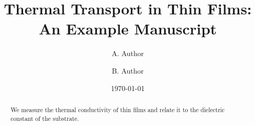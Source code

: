 \documentclass[11pt]{article}
\title{Thermal Transport in Thin Films: An Example Manuscript}
\author{A. Author \and B. Author}
\date{\today}
\begin{document}
\maketitle

\begin{abstract}
We measure the thermal conductivity of thin films and relate it to the dielectric
constant of the substrate.
\end{abstract}








\end{document}
